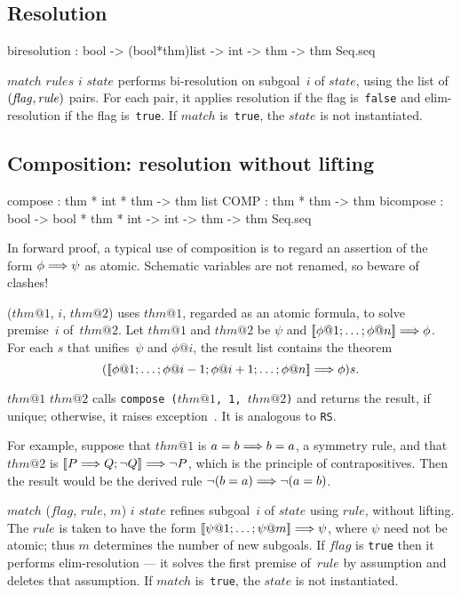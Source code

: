 \subsection{Resolution}
\begin{ttbox} 
biresolution : bool -> (bool*thm)list -> int -> thm
               -> thm Seq.seq
\end{ttbox}
\begin{ttdescription}
\item[\ttindexbold{biresolution} $match$ $rules$ $i$ $state$] 
performs bi-resolution on subgoal~$i$ of $state$, using the list of $\it
(flag,rule)$ pairs.  For each pair, it applies resolution if the flag
is~{\tt false} and elim-resolution if the flag is~{\tt true}.  If $match$
is~{\tt true}, the $state$ is not instantiated.
\end{ttdescription}


\subsection{Composition: resolution without lifting}
\begin{ttbox}
compose   : thm * int * thm -> thm list
COMP      : thm * thm -> thm
bicompose : bool -> bool * thm * int -> int -> thm
            -> thm Seq.seq
\end{ttbox}
In forward proof, a typical use of composition is to regard an assertion of
the form $\phi\Longrightarrow\psi$ as atomic.  Schematic variables are not renamed, so
beware of clashes!
\begin{ttdescription}
\item[\ttindexbold{compose} ($thm@1$, $i$, $thm@2$)] 
uses $thm@1$, regarded as an atomic formula, to solve premise~$i$
of~$thm@2$.  Let $thm@1$ and $thm@2$ be $\psi$ and $\List{\phi@1; \ldots;
\phi@n} \Imp \phi$.  For each $s$ that unifies~$\psi$ and $\phi@i$, the
result list contains the theorem
\[ (\List{\phi@1; \ldots; \phi@{i-1}; \phi@{i+1}; \ldots; \phi@n} \Imp \phi)s.
\]

\item[$thm@1$ \ttindexbold{COMP} $thm@2$] 
calls \hbox{\tt compose ($thm@1$, 1, $thm@2$)} and returns the result, if
unique; otherwise, it raises exception~\@.  It is
analogous to {\tt RS}\@.  

For example, suppose that $thm@1$ is $a=b\Longrightarrow b=a$, a symmetry rule, and
that $thm@2$ is $\mathopen{[\![} P\Longrightarrow Q; \neg Q\mathclose{]\!]} \Longrightarrow\neg P$, which is the
principle of contrapositives.  Then the result would be the
derived rule $\neg(b=a)\Longrightarrow\neg(a=b)$.

\item[\ttindexbold{bicompose} $match$ ($flag$, $rule$, $m$) $i$ $state$]
refines subgoal~$i$ of $state$ using $rule$, without lifting.  The $rule$
is taken to have the form $\List{\psi@1; \ldots; \psi@m} \Imp \psi$, where
$\psi$ need not be atomic; thus $m$ determines the number of new
subgoals.  If $flag$ is {\tt true} then it performs elim-resolution --- it
solves the first premise of~$rule$ by assumption and deletes that
assumption.  If $match$ is~{\tt true}, the $state$ is not instantiated.
\end{ttdescription}


